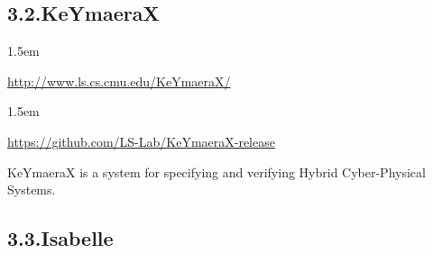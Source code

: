 \documentclass[12pt,twoside]{article}
\begin{document}
\subsection{3.2.\hspace*{0.5em}KeYmaeraX}%

\begin{mddefinitions}%


\begin{mdbmarginx}{}{}{}{1.5em}%
\begin{mddefdata}%
\href{http://www.ls.cs.cmu.edu/KeYmaeraX/}{{\ttfamily http://\hspace{0pt}www.\hspace{0pt}ls.\hspace{0pt}cs.\hspace{0pt}cmu.\hspace{0pt}edu/\hspace{0pt}KeYmaeraX/\hspace{0pt}}}
\end{mddefdata}%
\end{mdbmarginx}%


\begin{mdbmarginx}{}{}{}{1.5em}%
\begin{mddefdata}%
\href{https://github.com/LS-Lab/KeYmaeraX-release}{{\ttfamily https://\hspace{0pt}github.\hspace{0pt}com/\hspace{0pt}LS-\hspace{0pt}Lab/\hspace{0pt}KeYmaeraX-\hspace{0pt}release}}%
\end{mddefdata}%
\end{mdbmarginx}%
\end{mddefinitions}%

\noindent{}KeYmaeraX is a system for specifying and verifying Hybrid
Cyber-Physical Systems.%

\subsection{3.3.\hspace*{0.5em}Isabelle}%
\end{document}
